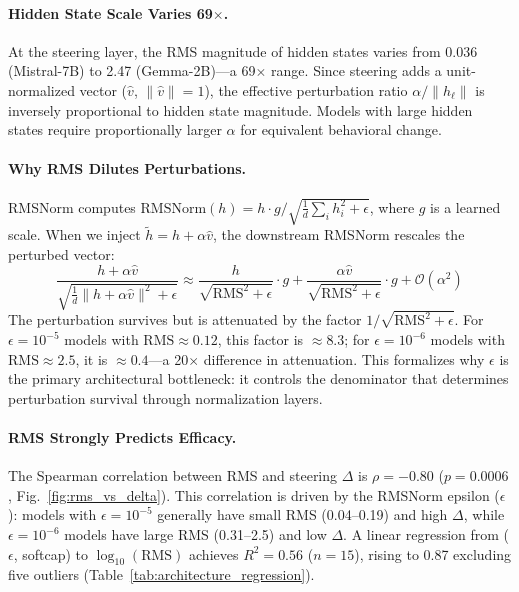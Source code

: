 \documentclass{article}
\begin{document}
\paragraph{Hidden State Scale Varies 69$\times$.} At the steering layer, the RMS magnitude of hidden states varies from 0.036 (Mistral-7B) to 2.47 (Gemma-2B)---a 69$\times$ range. Since steering adds a unit-normalized vector ($\hat{v}$, $\|\hat{v}\|{=}1$), the effective perturbation ratio $\alpha / \|h_\ell\|$ is inversely proportional to hidden state magnitude. Models with large hidden states require proportionally larger $\alpha$ for equivalent behavioral change.

\paragraph{Why RMS Dilutes Perturbations.}
RMSNorm computes $\text{RMSNorm}(h) = h \cdot g / \sqrt{\frac{1}{d}\sum_i h_i^2 + \epsilon}$, where $g$ is a learned scale. When we inject $\tilde{h} = h + \alpha\hat{v}$, the downstream RMSNorm rescales the perturbed vector:
\begin{equation}\label{eq:rmsnorm_effect}
\frac{h + \alpha\hat{v}}{\sqrt{\frac{1}{d}\|h + \alpha\hat{v}\|^2 + \epsilon}} \approx \frac{h}{\sqrt{\text{RMS}^2 + \epsilon}} \cdot g + \frac{\alpha\hat{v}}{\sqrt{\text{RMS}^2 + \epsilon}} \cdot g + \mathcal{O}(\alpha^2)
\end{equation}
The perturbation survives but is attenuated by the factor $1/\sqrt{\text{RMS}^2 + \epsilon}$. For $\epsilon{=}10^{-5}$ models with $\text{RMS}\approx 0.12$, this factor is $\approx 8.3$; for $\epsilon{=}10^{-6}$ models with $\text{RMS}\approx 2.5$, it is $\approx 0.4$---a 20$\times$ difference in attenuation. This formalizes why $\epsilon$ is the primary architectural bottleneck: it controls the denominator that determines perturbation survival through normalization layers.

\paragraph{RMS Strongly Predicts Efficacy.} The Spearman correlation between RMS and steering $\Delta$ is $\rho{=}{-}0.80$ ($p{=}0.0006$, Fig.~\ref{fig:rms_vs_delta}). This correlation is driven by the RMSNorm epsilon ($\epsilon$): models with $\epsilon{=}10^{-5}$ generally have small RMS (0.04--0.19) and high $\Delta$, while $\epsilon{=}10^{-6}$ models have large RMS (0.31--2.5) and low $\Delta$. A linear regression from ($\epsilon$, softcap) to $\log_{10}(\text{RMS})$ achieves $R^2{=}0.56$ ($n{=}15$), rising to 0.87 excluding five outliers (Table~\ref{tab:architecture_regression}).
\end{document}
